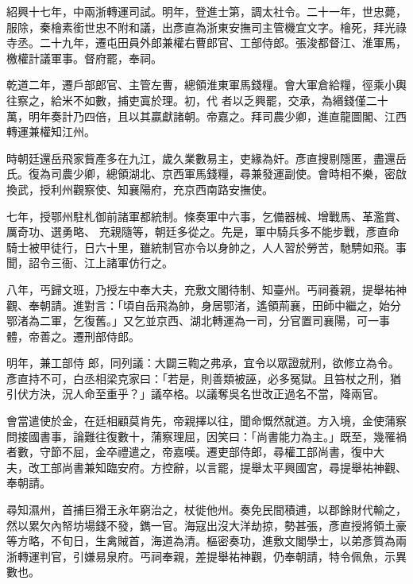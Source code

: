 \begin{pinyinscope}
 紹興十七年，中兩浙轉運司試。明年，登進士第，調太社令。二十一年，世忠薨，服除，秦檜素銜世忠不附和議，出彥直為浙東安撫司主管機宜文字。檜死，拜光祿寺丞。二十九年，遷屯田員外郎兼權右曹郎官、工部侍郎。張浚都督江、淮軍馬，檄權計議軍事。督府罷，奉祠。



 乾道二年，遷戶部郎官、主管左曹，總領淮東軍馬錢糧。會大軍倉給糧，徑乘小輿往察之，給米不如數，捕吏寘於理。初，代
 者以乏興罷，交承，為緡錢僅二十萬，明年奏計乃四倍，且以其贏獻諸朝。帝嘉之。拜司農少卿，進直龍圖閣、江西轉運兼權知江州。



 時朝廷還岳飛家貲產多在九江，歲久業數易主，吏緣為奸。彥直搜剔隱匿，盡還岳氏。復為司農少卿，總領湖北、京西軍馬錢糧，尋兼發運副使。會時相不樂，密啟換武，授利州觀察使、知襄陽府，充京西南路安撫使。



 七年，授鄂州駐札御前諸軍都統制。條奏軍中六事，乞備器械、增戰馬、革濫賞、厲奇功、選勇略、
 充親隨等，朝廷多從之。先是，軍中騎兵多不能步戰，彥直命騎士被甲徒行，日六十里，雖統制官亦令以身帥之，人人習於勞苦，馳騁如飛。事聞，詔令三衙、江上諸軍仿行之。



 八年，丐歸文班，乃授左中奉大夫，充敷文閣待制、知臺州。丐祠養親，提舉祐神觀、奉朝請。進對言：「頃自岳飛為帥，身居鄂渚，遙領荊襄，田師中繼之，始分鄂渚為二軍，乞復舊。」又乞並京西、湖北轉運為一司，分官置司襄陽，可一事體，帝善之。遷刑部侍郎。



 明年，兼工部侍
 郎，同列議：大闢三鞫之弗承，宜令以眾證就刑，欲修立為令。彥直持不可，白丞相梁克家曰：「若是，則善類被誣，必多冤獄。且笞杖之刑，猶引伏方決，況人命至重乎？」議卒格。以議奪吳名世改正過名不當，降兩官。



 會當遣使於金，在廷相顧莫肯先，帝親擇以往，聞命慨然就道。方入境，金使蒲察問接國書事，論難往復數十，蒲察理屈，因笑曰：「尚書能力為主。」既至，幾罹禍者數，守節不屈，金卒禮遣之，帝嘉嘆。遷吏部侍郎，尋權工部尚書，復中大
 夫，改工部尚書兼知臨安府。方控辭，以言罷，提舉太平興國宮，尋提舉祐神觀、奉朝請。



 尋知濕州，首捕巨猾王永年窮治之，杖徙他州。奏免民間積逋，以郡餘財代輸之，然以累欠內帑坊場錢不發，鐫一官。海寇出沒大洋劫掠，勢甚張，彥直授將領土豪等方略，不旬日，生禽賊首，海道為清。樞密奏功，進敷文閣學士，以弟彥質為兩浙轉運判官，引嫌易泉府。丐祠奉親，差提舉祐神觀，仍奉朝請，特令佩魚，示異數也。




\end{pinyinscope}
